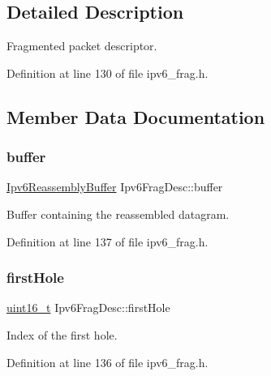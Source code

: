 \subsection{Detailed Description}
Fragmented packet descriptor. 

Definition at line 130 of file ipv6\+\_\+frag.\+h.



\subsection{Member Data Documentation}
\mbox{\label{structIpv6FragDesc_ac1c2c93db751730aa55d827f14c5ba60}} 
\subsubsection{\texorpdfstring{buffer}{buffer}}
{\footnotesize\ttfamily \hyperlink{structIpv6ReassemblyBuffer}{Ipv6\+Reassembly\+Buffer} Ipv6\+Frag\+Desc\+::buffer}



Buffer containing the reassembled datagram. 



Definition at line 137 of file ipv6\+\_\+frag.\+h.

\mbox{\label{structIpv6FragDesc_a9e51e5d6a1717ca6d115fac412a72515}} 
\subsubsection{\texorpdfstring{first\+Hole}{firstHole}}
{\footnotesize\ttfamily \hyperlink{stdint_8h_a273cf69d639a59973b6019625df33e30}{uint16\+\_\+t} Ipv6\+Frag\+Desc\+::first\+Hole}



Index of the first hole. 



Definition at line 136 of file ipv6\+\_\+frag.\+h.

\mbox{\label{structIpv6FragDesc_a211456cd7a2b9db9d3892b5c54b348df}} 
